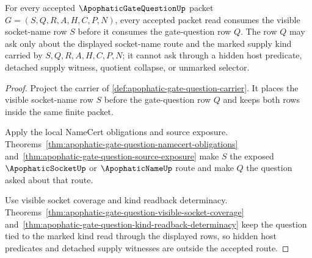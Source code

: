 \begin{theorem}
\label{thm:apophatic-gate-question-question-exactness-route}
For every accepted $\ApophaticGateQuestionUp$ packet $G=(S,Q,R,A,H,C,P,N)$, every accepted packet read consumes the visible socket-name row $S$ before it consumes the gate-question row $Q$. The row $Q$ may ask only about the displayed socket-name route and the marked supply kind carried by $S,Q,R,A,H,C,P,N$; it cannot ask through a hidden host predicate, detached supply witness, quotient collapse, or unmarked selector.
\end{theorem}
\begin{proof}
Project the carrier of \autoref{def:apophatic-gate-question-carrier}. It places the visible socket-name row $S$ before the gate-question row $Q$ and keeps both rows inside the same finite packet.

Apply the local NameCert obligations and source exposure. Theorems~\ref{thm:apophatic-gate-question-namecert-obligations} and~\ref{thm:apophatic-gate-question-source-exposure} make $S$ the exposed $\ApophaticSocketUp$ or $\ApophaticNameUp$ route and make $Q$ the question asked about that route.

Use visible socket coverage and kind readback determinacy. Theorems~\ref{thm:apophatic-gate-question-visible-socket-coverage} and~\ref{thm:apophatic-gate-question-kind-readback-determinacy} keep the question tied to the marked kind read through the displayed rows, so hidden host predicates and detached supply witnesses are outside the accepted route.
\end{proof}

